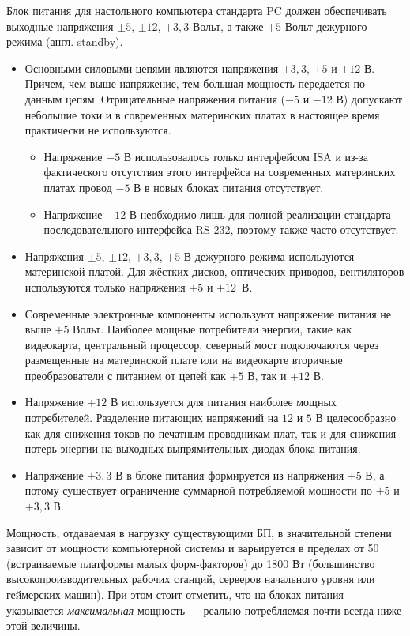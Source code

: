 Блок питания для настольного компьютера стандарта PC должен обеспечивать выходные напряжения $\pm 5$, $\pm 12$, $+3,3$ Вольт, а также $+5$ Вольт дежурного режима (англ. standby).
\begin{itemize}
 \item Основными силовыми цепями являются напряжения $+3,3$, $+5$ и $+12$ В. Причем, чем выше напряжение, тем большая мощность передается по данным цепям. Отрицательные напряжения питания ($−5$ и $−12$ В) допускают небольшие токи и в современных материнских платах в настоящее время практически не используются. 
 \begin{itemize}
  \item Напряжение $−5$ В использовалось только интерфейсом ISA и из-за фактического отсутствия этого интерфейса на современных материнских платах провод $−5$ В в новых блоках питания отсутствует.
  \item Напряжение $−12$ В необходимо лишь для полной реализации стандарта последовательного интерфейса RS-232, поэтому также часто отсутствует.
 \end{itemize}
 \item Напряжения $\pm 5$, $\pm 12$, $+3,3$, $+5$ В дежурного режима используются материнской платой. Для жёстких дисков, оптических приводов, вентиляторов используются только напряжения $+5$ и $+12$~В.
 \item Современные электронные компоненты используют напряжение питания не выше $+5$ Вольт. Наиболее мощные потребители энергии, такие как видеокарта, центральный процессор, северный мост подключаются через размещенные на материнской плате или на видеокарте вторичные преобразователи с питанием от цепей как $+5$ В, так и $+12$ В.
 \item Напряжение $+12$ В используется для питания наиболее мощных потребителей. Разделение питающих напряжений на $12$ и $5$ В целесообразно как для снижения токов по печатным проводникам плат, так и для снижения потерь энергии на выходных выпрямительных диодах блока питания.
 \item Напряжение $+3,3$ В в блоке питания формируется из напряжения $+5$ В, а потому существует ограничение суммарной потребляемой мощности по $\pm 5$ и $+3,3$ В.
\end{itemize}

Мощность, отдаваемая в нагрузку существующими БП, в значительной степени зависит от мощности компьютерной системы и варьируется в пределах от 50 (встраиваемые платформы малых форм-факторов) до 1800 Вт (большинство высокопроизводительных рабочих станций, серверов начального уровня или геймерских машин).
При этом стоит отметить, что на блоках питания указывается \emph{максимальная} мощность --- реально потребляемая почти всегда ниже этой величины.

